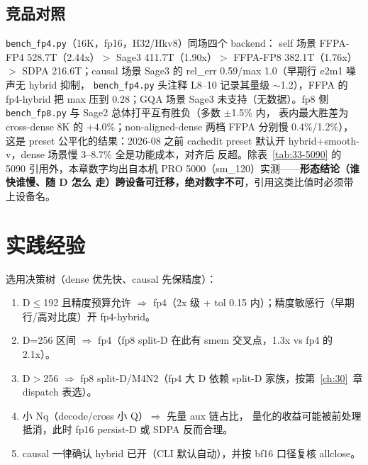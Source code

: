 \subsection{竞品对照}

\texttt{bench\_fp4.py}（16K，fp16，H32/Hkv8）同场四个 backend：
self 场景 FFPA-FP4 528.7T（2.44x）$>$ Sage3 411.7T（1.90x）$>$
FFPA-FP8 382.1T（1.76x）$>$ SDPA 216.6T；causal 场景 Sage3 的
rel\_err 0.59/max 1.0（早期行 e2m1 噪声无 hybrid 抑制，
\texttt{bench\_fp4.py} 头注释 L8--10 记录其量级 $\sim$1.2），FFPA
的 fp4-hybrid 把 max 压到 0.28；GQA 场景 Sage3 未支持（无数据）。fp8 侧
\texttt{bench\_fp8.py} 与 Sage2 总体打平互有胜负（多数 $\pm$1.5\% 内，
表内最大胜差为 cross-dense 8K 的 $+4.0\%$；non-aligned-dense
两档 FFPA 分别慢 0.4\%/1.2\%），
这是 preset 公平化的结果：2026-08 之前 cachedit preset 默认开
hybrid+smooth-v，dense 场景慢 3--8.7\% 全是功能成本，对齐后
反超。除表~\ref{tab:33-5090} 的 5090 引用外，本章数字均出自本机
PRO 5000（sm\_120）实测——\textbf{形态结论（谁快谁慢、随 D 怎么
走）跨设备可迁移，绝对数字不可}，引用这类比值时必须带上设备名。


\section{实践经验}

选用决策树（dense 优先快、causal 先保精度）：
\begin{enumerate}[itemsep=0pt,topsep=2pt]
  \item D$\le$192 且精度预算允许 $\Rightarrow$ fp4（2x 级 + tol
        0.15 内）；精度敏感行（早期行/高对比度）开 fp4-hybrid。
  \item D=256 区间 $\Rightarrow$ fp4（fp8 split-D 在此有 smem
        交叉点，1.3x vs fp4 的 2.1x）。
  \item D$>$256 $\Rightarrow$ fp8 split-D/M4N2（fp4 大 D 依赖
        split-D 家族，按第~\ref{ch:30}~章 dispatch 表选）。

  \item 小 Nq（decode/cross 小 Q）$\Rightarrow$ 先量 aux 链占比，
        量化的收益可能被前处理抵消，此时 fp16 persist-D 或 SDPA
        反而合理。
  \item causal 一律确认 hybrid 已开（CLI 默认自动），并按 bf16
        口径复核 allclose。
\end{enumerate}

